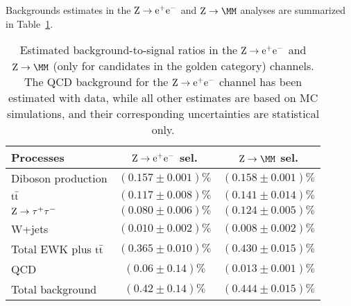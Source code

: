 Backgrounds estimates in the $\mathrm{Z} \rightarrow \mathrm{e}^+\mathrm{e}^-$ and $\Zmm$ analyses are summarized in Table~\ref{tab:ZllBG}.
\begin{table} %
\begin{center}
\caption[.]{\label{tab:ZllBG}
Estimated background-to-signal ratios in the $\mathrm{Z} \rightarrow \mathrm{e}^+\mathrm{e}^-$ and $\Zmm$ (only for candidates
in the golden category) channels.
The QCD background for the $\mathrm{Z} \rightarrow \mathrm{e}^+\mathrm{e}^-$ channel has been estimated with data,
while all other estimates are based on MC simulations, and their corresponding uncertainties
are statistical only.}
\begin{tabular}{|l|c|c|}
\hline
Processes & $\mathrm{Z} \rightarrow \mathrm{e}^+\mathrm{e}^-$ sel. & $\Zmm$ sel. \\
\hline\hline
Diboson production   & $(0.157\pm 0.001)\%$ & $(0.158\pm 0.001)\%$ \\
$\mathrm{t}\bar{\mathrm{t}}$             & $(0.117\pm 0.008)\%$ & $(0.141\pm 0.014)\%$ \\
$\mathrm{Z} \rightarrow \tau^+\tau^-$               & $(0.080\pm 0.006)\%$ & $(0.124\pm 0.005)\%$ \\
W+jets               & $(0.010\pm 0.002)\%$ & $(0.008\pm 0.002)\%$ \\
\hline
Total EWK plus $\mathrm{t}\bar{\mathrm{t}}$  & $(0.365\pm 0.010)\%$ & $(0.430\pm 0.015)\%$ \\
\hline
QCD            & $(0.06\pm 0.14)\%$ &  $(0.013\pm 0.001)\%$ \\
\hline
Total background                & $(0.42\pm 0.14)\%$ & $(0.444\pm 0.015)\%$ \\
\hline
\end{tabular}
\end{center}
\end{table}








